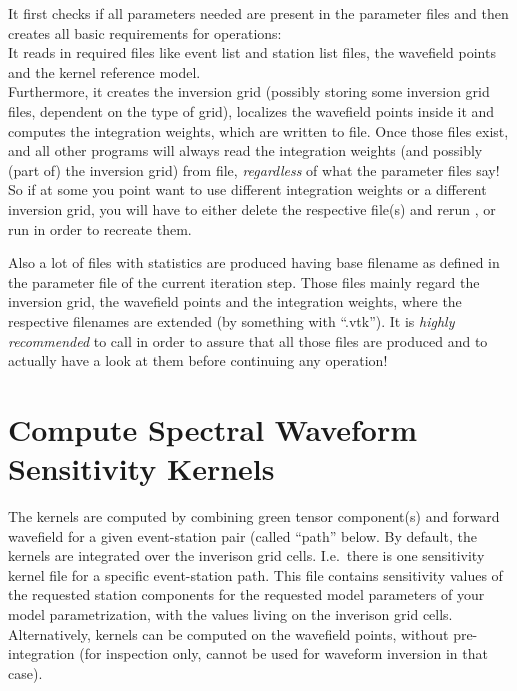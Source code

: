 It first checks if all parameters needed are present in the parameter files and then creates all
basic requirements for \ASKI{} operations:\\
It reads in required files like event list and station list files, the wavefield points and the 
kernel reference model. \\
Furthermore, it creates the inversion grid (possibly storing some inversion grid files, dependent 
on the type of grid), localizes the wavefield points inside it and computes 
the integration weights, which are written to file. Once those files exist,  
and all other programs will always read the integration weights (and possibly (part of) the inversion grid) 
from file, \emph{regardless} of what the parameter files say! So if at some you point want to use 
different integration weights or a different inversion grid, you will have to either delete the respective 
file(s) and rerun , or run  in order
to recreate them. 

Also a lot of  files with statistics are produced having base filename  as 
defined in the parameter file of the current iteration step. Those files mainly regard the inversion grid, 
the wavefield points and the integration weights, where the respective filenames are extended (by something 
with ``.vtk''). It is \emph{highly recommended} to call  in order to assure that all
those  files are produced and to actually have a look at them before continuing any \ASKI{} operation!
%
\section{Compute Spectral Waveform Sensitivity Kernels} \label{basic_steps,sec:compute_kernels}
%
The kernels are computed by combining green tensor component(s) and forward wavefield for a given event-station
pair (called ``path'' below. By default, the kernels are integrated over the inverison grid cells. I.e.\ there is one sensitivity 
kernel file for a specific event-station path. This file contains sensitivity values of the requested 
station components for the requested model parameters of your model parametrization, with 
the values living on the inverison grid cells. Alternatively, kernels can be computed on the wavefield points,
without pre-integration (for inspection only, cannot be used for waveform inversion in that case).

